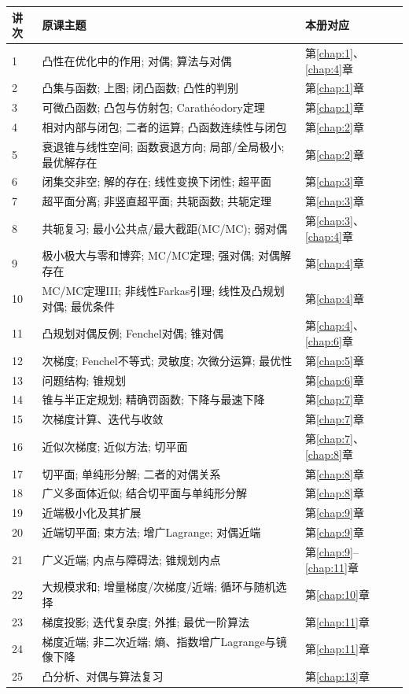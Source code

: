 \begin{longtable}{@{}p{0.8cm}p{10.8cm}p{3.9cm}@{}}
\toprule 讲次 & 原课主题 & 本册对应\\\midrule\endhead
1 & 凸性在优化中的作用; 对偶; 算法与对偶 & 第\ref{chap:1}、\ref{chap:4}章\\
2 & 凸集与函数; 上图; 闭凸函数; 凸性的判别 & 第\ref{chap:1}章\\
3 & 可微凸函数; 凸包与仿射包; Carathéodory定理 & 第\ref{chap:1}章\\
4 & 相对内部与闭包; 二者的运算; 凸函数连续性与闭包 & 第\ref{chap:2}章\\
5 & 衰退锥与线性空间; 函数衰退方向; 局部/全局极小; 最优解存在 & 第\ref{chap:2}章\\
6 & 闭集交非空; 解的存在; 线性变换下闭性; 超平面 & 第\ref{chap:3}章\\
7 & 超平面分离; 非竖直超平面; 共轭函数; 共轭定理 & 第\ref{chap:3}章\\
8 & 共轭复习; 最小公共点/最大截距(MC/MC); 弱对偶 & 第\ref{chap:3}、\ref{chap:4}章\\
9 & 极小极大与零和博弈; MC/MC定理; 强对偶; 对偶解存在 & 第\ref{chap:4}章\\
10 & MC/MC定理III; 非线性Farkas引理; 线性及凸规划对偶; 最优条件 & 第\ref{chap:4}章\\
11 & 凸规划对偶反例; Fenchel对偶; 锥对偶 & 第\ref{chap:4}、\ref{chap:6}章\\
12 & 次梯度; Fenchel不等式; 灵敏度; 次微分运算; 最优性 & 第\ref{chap:5}章\\
13 & 问题结构; 锥规划 & 第\ref{chap:6}章\\
14 & 锥与半正定规划; 精确罚函数; 下降与最速下降 & 第\ref{chap:7}章\\
15 & 次梯度计算、迭代与收敛 & 第\ref{chap:7}章\\
16 & 近似次梯度; 近似方法; 切平面 & 第\ref{chap:7}、\ref{chap:8}章\\
17 & 切平面; 单纯形分解; 二者的对偶关系 & 第\ref{chap:8}章\\
18 & 广义多面体近似; 结合切平面与单纯形分解 & 第\ref{chap:8}章\\
19 & 近端极小化及其扩展 & 第\ref{chap:9}章\\
20 & 近端切平面; 束方法; 增广Lagrange; 对偶近端 & 第\ref{chap:9}章\\
21 & 广义近端; 内点与障碍法; 锥规划内点 & 第\ref{chap:9}--\ref{chap:11}章\\
22 & 大规模求和; 增量梯度/次梯度/近端; 循环与随机选择 & 第\ref{chap:10}章\\
23 & 梯度投影; 迭代复杂度; 外推; 最优一阶算法 & 第\ref{chap:11}章\\
24 & 梯度近端; 非二次近端; 熵、指数增广Lagrange与镜像下降 & 第\ref{chap:11}章\\
25 & 凸分析、对偶与算法复习 & 第\ref{chap:13}章\\\bottomrule
\end{longtable}

